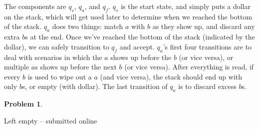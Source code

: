 \documentclass[11pt]{article}
\theoremstyle{definition}
\theoremstyle{case}
\theoremstyle{theorem}
\newtheorem{prob}{Problem}
\begin{document}


The components are $q_s$, $q_a$, and $q_f$. $q_s$ is the start state, and simply puts a dollar
on the stack, which will get used later to determine when we reached the bottom of the stack.
$q_a$ does two things: match $a$ with $b$ as they show up, and discard any extra $b$s at the
end. Once we've reached the bottom of the stack (indicated by the dollar), we can safely 
transition to $q_f$ and accept. $q_a$'s first four transitions are to deal with scenarios
in which the $a$ shows up before the $b$ (or vice versa), or multiple $a$s shows up before the 
next $b$ (or vice versa). After everything is read, if every $b$ is used to wipe out a $a$ 
(and vice versa), the stack should end up with only $b$s, or empty (with dollar). The last 
transition of $q_a$ is to discard excess $b$s.

\begin{prob}\end{prob}

Left empty -- submitted online
\end{document}
